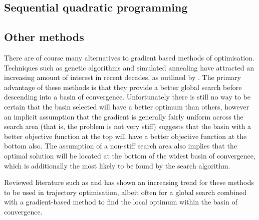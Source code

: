 \subsection{Sequential quadratic programming} \label{sub:SQP-lit}
\subsection{Other methods} \label{sub:Other-lit}

There are of course many alternatives to gradient based methods of optimisation. Techniques such as genetic algorithms and simulated annealing have attracted an increasing amount of interest in recent decades, as outlined by \textcite{Ren2007}. The primary advantage of these methods is that they provide a better global search before descending into a basin of convergence. Unfortunately there is still no way to be certain that the basin selected will have a better optimum than others, however an implicit assumption that the gradient is generally fairly uniform across the search area (that is, the problem is not very stiff) suggests that the basin with a better objective function at the top will have a better objective function at the bottom also. The assumption of a non-stiff search area also implies that the optimal solution will be located at the bottom of the widest basin of convergence, which is additionally the most likely to be found by the search algorithm.


Reviewed literature such as \textcite{Dachwald2005} and \textcite{Jackson2008} has shown an increasing trend for these methods to be used in trajectory optimisation, albeit often for a global search combined with a gradient-based method to find the local optimum within the basin of convergence. 

